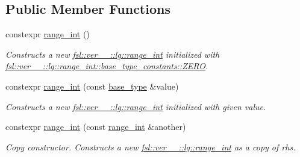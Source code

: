 \subsection*{Public Member Functions}
\begin{DoxyCompactItemize}
\item 
\mbox{\label{classfsl_1_1ver__1__0_1_1lg_1_1range__int_acab1d8507d2ee32ae77216e4900b8ff0}} 
constexpr \mbox{\hyperlink{classfsl_1_1ver__1__0_1_1lg_1_1range__int_acab1d8507d2ee32ae77216e4900b8ff0}{range\+\_\+int}} ()
\begin{DoxyCompactList}\small\item\em Constructs a new \mbox{\hyperlink{classfsl_1_1ver__1__0_1_1lg_1_1range__int}{fsl\+::ver\+\_\+\_\+::lg\+::range\+\_\+int}} initialized with \mbox{\hyperlink{structfsl_1_1ver__1__0_1_1lg_1_1range__int_1_1base__type__constants_ada13cd01546095bb61095888cd0ab41d}{fsl\+::ver\+\_\+\_\+::lg\+::range\+\_\+int\+::base\+\_\+type\+\_\+constants\+::\+Z\+E\+RO}}. \end{DoxyCompactList}\item 
constexpr \mbox{\hyperlink{classfsl_1_1ver__1__0_1_1lg_1_1range__int_af2d5d7b2a049515ae1411d4a0eb6b528}{range\+\_\+int}} (const \mbox{\hyperlink{classfsl_1_1ver__1__0_1_1lg_1_1range__int_aa6c763f6d72d18c8b9129c0c06628cd3}{base\+\_\+type}} \&value)
\begin{DoxyCompactList}\small\item\em Constructs a new \mbox{\hyperlink{classfsl_1_1ver__1__0_1_1lg_1_1range__int}{fsl\+::ver\+\_\+\_\+::lg\+::range\+\_\+int}} initialized with given {\itshape value}. \end{DoxyCompactList}\item 
\mbox{\label{classfsl_1_1ver__1__0_1_1lg_1_1range__int_aba61ca2b02f80a0f5af9550d9b222d5d}} 
constexpr \mbox{\hyperlink{classfsl_1_1ver__1__0_1_1lg_1_1range__int_aba61ca2b02f80a0f5af9550d9b222d5d}{range\+\_\+int}} (const \mbox{\hyperlink{classfsl_1_1ver__1__0_1_1lg_1_1range__int}{range\+\_\+int}} \&another)
\begin{DoxyCompactList}\small\item\em Copy constructor. Constructs a new \mbox{\hyperlink{classfsl_1_1ver__1__0_1_1lg_1_1range__int}{fsl\+::ver\+\_\+\_\+::lg\+::range\+\_\+int}} as a copy of {\itshape rhs}. \end{DoxyCompactList}\item 

\end{DoxyCompactItemize}

